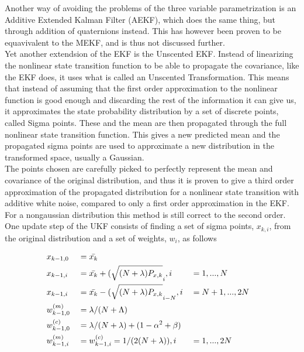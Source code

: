 Another way of avoiding the problems of the three variable parametrization is an Additive Extended Kalman Filter (AEKF), which does the same thing, but through addition of quaternions instead. This has however been proven to be equavivalent to the MEKF\cite{AEKF}, and is thus not discussed further. \\

Yet another extendsion of the EKF is the Unscented EKF\cite{UKF}. Instead of linearizing the nonlinear state transition function to be able to propagate the covariance, like the EKF does, it uses what is called an Unscented Transformation\cite{UTrans}. This means that instead of assuming that the first order approximation to the nonlinear function is good enough and discarding the rest of the information it can give us, it approximates the state probability distribution by a set of discrete points, called Sigma points. These and the mean are then propagated through the full nonlinear state transition function. This gives a new predicted mean and the propagated sigma points are used to approximate a new distribution in the transformed space, usually a Gaussian. \\

The points chosen are carefully picked to perfectly represent the mean and covariance of the original distribution, and thus it is proven to give a third order approximation of the propagated distribution for a nonlinear state transition with additive white noise, compared to only a first order approximation in the EKF. For a nongaussian distribution this method is still correct to the second order.\\ 

One update step of the UKF consists of finding a set of sigma points, $x_{k,i}$, from the original distribution and a set of weights, $w_i$, as follows

\begin{alignat*}{3}
    & x_{k-1,0} &&= \Bar{x_k} \\
    & x_{k-1,i} &&= \Bar{x_k} + (\sqrt{(N+\lambda)P_{x,k}}_i, i &&= 1,...,N \\
    & x_{k-1,i} &&= \Bar{x_k} - (\sqrt{(N+\lambda)P_{x,k}}_{i-N}, i &&=N + 1,...,2N \\
    & w_{k-1,0}^{(m)} &&= \lambda/(N+\Lambda) \\ 
    & w_{k-1,0}^{(c)} &&= \lambda/(N+\lambda) + (1-\alpha^2 + \beta) \\
    & w_{k-1,i}^{(m)} &&= w_{k-1,i}^{(c)} = 1/(2(N+\lambda)), i &&= 1,...,2N
\end{alignat*}

